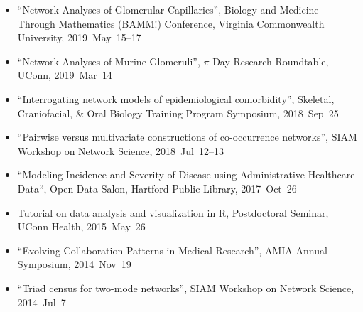 \documentclass[10pt,a4paper]{article}
\begin{document}
\begin{itemize}[label=$\circ$,nolistsep]
\item
``Network Analyses of Glomerular Capillaries'', Biology and Medicine Through Mathematics (BAMM!) Conference, Virginia Commonwealth University, 2019~May~15--17
\item
``Network Analyses of Murine Glomeruli'', $\pi$ Day Research Roundtable, UConn, 2019~Mar~14
\item
``Interrogating network models of epidemiological comorbidity'', Skeletal, Craniofacial, \& Oral Biology Training Program Symposium, 2018~Sep~25
\item
``Pairwise versus multivariate constructions of co-occurrence networks'', SIAM Workshop on Network Science, 2018~Jul~12--13
\item
``Modeling Incidence and Severity of Disease using Administrative Healthcare Data``, Open Data Salon, Hartford Public Library, 2017~Oct~26
\item
Tutorial on data analysis and visualization in R, Postdoctoral Seminar, UConn Health, 2015~May~26
\item
``Evolving Collaboration Patterns in Medical Research'', AMIA Annual Symposium, 2014~Nov~19
\item
``Triad census for two-mode networks'', SIAM Workshop on Network Science, 2014~Jul~7

\end{itemize}
\end{document}
